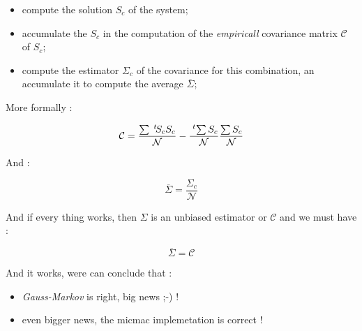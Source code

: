 \begin{itemize}
     \item compute the solution $S_c$  of the system;

     \item accumulate the $S_c$ in the computation of the \emph{empiricall} covariance matrix $\mathcal{C}$ of $S_c$;

     \item compute the estimator $\Sigma_c $ of the covariance for this combination, an accumulate it
	     to compute the average  $\overline \Sigma$;
\end{itemize}

More formally :

\begin{equation}
	\mathcal{C} =  \frac{\sum \; ^{t} \! S_c S_c }{\mathcal{N}} -   \frac{\; ^{t} \! \sum S_c}{\mathcal{N}}  \frac{\sum S_c}{\mathcal{N}}
\end{equation}

And  :

\begin{equation}
	\overline \Sigma =  \frac{\Sigma_c }{\mathcal{N}} 
\end{equation}


And if every thing works, then $ \Sigma$ is an unbiased estimator or $ \mathcal{C} $ and we must have :

\begin{equation}
	\overline \Sigma   = \mathcal{C}
\end{equation}

And it works, were can conclude that :

\begin{itemize}
     \item \emph{Gauss-Markov} is right, big news ;-) !
    \item even bigger news, the micmac implemetation is correct !
\end{itemize}



